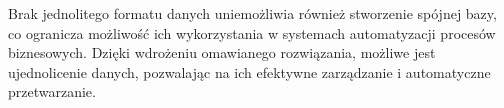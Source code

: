 Brak jednolitego formatu danych uniemożliwia również stworzenie spójnej bazy, co ogranicza możliwość ich wykorzystania w systemach automatyzacji procesów biznesowych. Dzięki wdrożeniu omawianego rozwiązania, możliwe jest ujednolicenie danych, pozwalając na ich efektywne zarządzanie i automatyczne przetwarzanie.